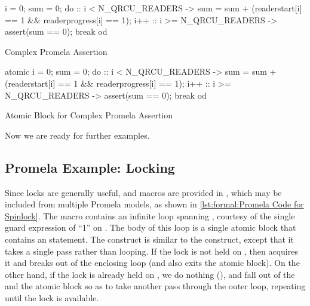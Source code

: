\begin{listing}
\begin{VerbatimL}
i = 0;
sum = 0;
do
:: i < N_QRCU_READERS ->
	sum = sum + (readerstart[i] == 1 &&
	             readerprogress[i] == 1);
	i++
:: i >= N_QRCU_READERS ->
	assert(sum == 0);
	break
od
\end{VerbatimL}
\caption{Complex Promela Assertion}
\label{lst:formal:Complex Promela Assertion}
\end{listing}

\begin{listing}
\begin{VerbatimL}
atomic {
	i = 0;
	sum = 0;
	do
	:: i < N_QRCU_READERS ->
		sum = sum + (readerstart[i] == 1 &&
		             readerprogress[i] == 1);
		i++
	:: i >= N_QRCU_READERS ->
		assert(sum == 0);
		break
	od
}
\end{VerbatimL}
\caption{Atomic Block for Complex Promela Assertion}
\label{lst:formal:Atomic Block for Complex Promela Assertion}
\end{listing}

Now we are ready for further examples.

\subsection{Promela Example: Locking}
\label{sec:formal:Promela Example: Locking}

\begin{fcvref}
Since locks are generally useful,  and
macros are provided in , which may be included from
multiple Promela models, as shown in
\cref{lst:formal:Promela Code for Spinlock}.
The  macro contains an infinite  loop
spanning ,
courtesy of the single guard expression of ``1'' on .
The body of this loop is a single atomic block that contains
an  statement.
The  construct is similar to the  construct, except
that it takes a single pass rather than looping.
If the lock is not held on , then
 acquires it and
 breaks out of the enclosing  loop (and also exits
the atomic block).
On the other hand, if the lock is already held on ,
we do nothing (), and fall out of the  and the
atomic block so as to take another pass through the outer
loop, repeating until the lock is available.
\end{fcvref}

